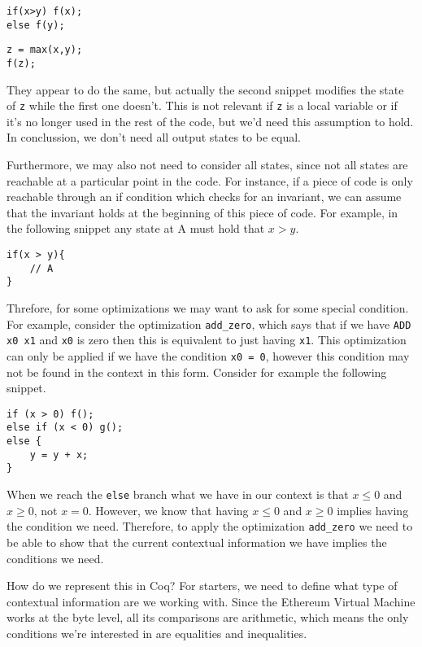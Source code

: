 \begin{verbatim}
if(x>y) f(x);
else f(y);
\end{verbatim}

\begin{verbatim}
z = max(x,y);
f(z);
\end{verbatim}

They appear to do the same, but actually the second snippet modifies the state of \texttt{z} while the first one
doesn't. This is not relevant if \texttt{z} is a local variable or if it's no longer used in the rest of the code,
but we'd need this assumption to hold. In conclussion, we don't need all output states to be equal.

Furthermore, we may also not need to consider all states, since not all states are reachable at a particular
point in the code. For instance, if a piece of code is only reachable through an if condition which checks
for an invariant, we can assume that the invariant holds at the beginning of this piece of code. For
example, in the following snippet any state at A must hold that $x > y$.

\begin{verbatim}
if(x > y){
    // A
}
\end{verbatim}

Threfore, for some optimizations we may want to ask for some special condition. For example, consider the
optimization \texttt{add_zero}, which says that if we have \texttt{ADD x0 x1} and \texttt{x0} is zero then this is equivalent to
just having \texttt{x1}. This optimization can only be applied if we have the condition \texttt{x0 = 0}, however this 
condition may not be found in the context in this form. Consider for example the following snippet.

\begin{verbatim}
if (x > 0) f();
else if (x < 0) g();
else {
    y = y + x;
}
\end{verbatim}

When we reach the \texttt{else} branch what we have in our context is that $x \le 0$ and $x \ge 0$, not $x = 0$.
However, we know that having $x \le 0$ and $x \ge 0$ implies having the condition we need. Therefore, to 
apply the optimization \texttt{add_zero} we need to be able to show that the current contextual information we
have implies the conditions we need.

How do we represent this in Coq? For starters, we need to define what type of contextual information are 
we working with. Since the Ethereum Virtual Machine works at the byte level, all its comparisons are 
arithmetic, which means the only conditions we're interested in are equalities and inequalities.

